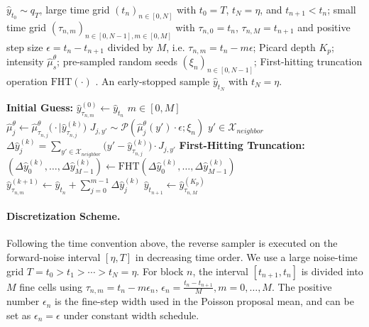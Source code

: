 \documentclass{article}
\begin{document}
\begin{algorithm}[ht]
\caption{Parallel $\tau$-Leaping Algorithm for Discrete Diffusion Model Sampling}
\label{predictor}
\begin{algorithmic}[1]
\REQUIRE $\widehat y_{t_0}\sim q_T$, large time grid $(t_n)_{n\in[0,N]}$ with $t_0=T$, $t_N=\eta$, and $t_{n+1}<t_n$; small time grid $(\tau_{n,m})_{n\in[0,N-1],m\in[0,M]}$ with $\tau_{n,0}=t_n$, $\tau_{n,M}=t_{n+1}$ and positive step size $\epsilon=t_n-t_{n+1}$ divided by $M$, i.e. $\tau_{n,m}=t_n-m\epsilon$;
Picard depth $K_p$; intensity $\widehat\mu_s^\theta$; pre-sampled random seeds $(\xi_n)_{n\in[0,N-1]}$; First-hitting truncation operation $\mathrm{FHT}(\cdot)$ .
\ENSURE An early-stopped sample $\widehat y_{t_N}$ with $t_N=\eta$.

    \STATE \textbf{Initial Guess:} $\widehat{y}^{(0)}_{\tau_{n,m}}\gets\widehat{y}_{t_n} $  $m\in[0,M]$\\
            \STATE $\widehat{\mu}^{\theta}_{j}\gets \widehat{\mu}^{\theta}_{\tau_{n,j}}\big( \cdot|\widehat{y}^{(k)}_{\tau_{n,j}}\big)$
            \STATE $J_{j,y'}\sim \mathcal{P}(\widehat{\mu}^{\theta}_{j}(y')\cdot\epsilon;\xi_n)$  $y'\in\mathcal{X}_{neighbor}$
            \STATE $\Delta\widehat{y}^{(k)}_j=\sum_{y'\in\mathcal{X}_{neighbor}}\big(y'-\widehat{y}^{(k)}_{\tau_{n,j}}\big)\cdot J_{j,y'}$
        \ENDFOR
        \STATE \textbf{First-Hitting Truncation:} $(\Delta\widehat y^{(k)}_0,\ldots,\Delta\widehat y^{(k)}_{M-1})\gets\mathrm{FHT}\!\left(\Delta\widehat y^{(k)}_0,\ldots,\Delta\widehat y^{(k)}_{M-1}\right)$
            \STATE $\widehat{y}^{(k+1)}_{\tau_{n,m}}\gets\widehat{y}_{t_n}+\sum^{m-1}_{j=0}\Delta\widehat{y}^{(k)}_{j}$
        \ENDFOR
    \ENDFOR
    \STATE $\widehat{y}_{t_{n+1}}\gets \widehat{y}^{(K_p)}_{\tau_{n,M}}$
\ENDFOR
\end{algorithmic}
\end{algorithm}



\paragraph{Discretization Scheme.}
Following the time convention above, the reverse sampler is executed on the forward-noise interval \([\eta,T]\) in decreasing time order. We use a large noise-time grid
$T=t_0>t_1>\cdots>t_N=\eta$.
For block \(n\), the interval \([t_{n+1},t_n]\) is divided into \(M\) fine cells using $\tau_{n,m}=t_n-m\epsilon_n$,
$\epsilon_n=\frac{t_n-t_{n+1}}{M},m=0,\ldots,M$.
The positive number \(\epsilon_n\) is the fine-step width used in the Poisson proposal mean, and can be set as $\epsilon_n=\epsilon$ under constant width schedule.
\end{document}
